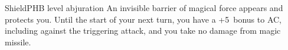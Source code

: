 \begin{spell}{Shield}{PHB}{ level abjuration}
{
}
An invisible barrier of magical force appears and
protects you. Until the start of your next turn, you have a
+5~bonus to AC, including against the triggering attack,
and you take no damage from magic missile.
\end{spell}